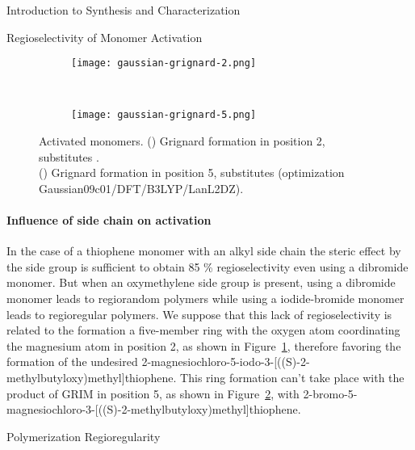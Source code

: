 \begin{section}{Introduction to Synthesis and Characterization}
\begin{subsection}{Regioselectivity of Monomer Activation}
\begin{SCfigure}[][tbp]%
\centering
\begin{subfigure}[b]{0.35\textwidth}
\centering
\texttt{[image: gaussian-grignard-2.png]}
\subcaption{}
\label{fig:gaussian-grignard-2}
\end{subfigure}%
~%
\begin{subfigure}[b]{0.28\textwidth}
\centering
\texttt{[image: gaussian-grignard-5.png]}
\caption{}
\label{fig:gaussian-grignard-5}
\end{subfigure}
\caption[Activated monomers.]{Activated monomers. () Grignard formation in position 2,  substitutes .\\ () Grignard formation in position 5,  substitutes  (optimization Gaussian\-09c01\-/DFT\-/B3LYP\-/LanL2DZ).}\label{fig:gaussian-grignard}
\end{SCfigure}

\paragraph{Influence of side chain on activation} In the case of a thiophene monomer with an alkyl side chain the steric effect by the side group is sufficient to obtain 85 \% regioselectivity even using a dibromide monomer. 
But when an oxy\-methylene side group is present, using a dibromide monomer leads to regiorandom polymers while using a iodide-bromide monomer leads to regioregular polymers. 
We suppose that this lack of regioselectivity is related to the formation a five-member ring with the oxygen atom coordinating the magnesium atom in position 2, as shown in Figure~\ref{fig:gaussian-grignard-2}, therefore favoring the formation of the undesired 2-magnesio\-chloro-5-iodo-3-[((S)-2-methyl\-butyl\-oxy)\-methyl]\-thio\-phene. This ring formation can't take place with the product of \gls{GRIM} in position 5, as shown in Figure~\ref{fig:gaussian-grignard-5}, with 2-bromo-5-magnesio\-chloro-3-[((S)-2-methyl\-butyl\-oxy)\-methyl]\-thio\-phene.

\end{subsection}
\begin{subsection}{Polymerization Regioregularity}


\end{subsection}
\end{section}
